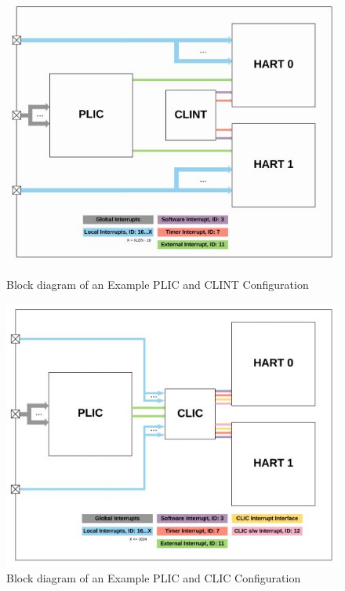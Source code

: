 \documentclass[12pt]{article}
\begin{document}
\begin{figure}
    \centering
    \includegraphics[scale=0.8]{PLIC and CLINT Block Diagram.JPG}
    \caption{Block diagram of an Example PLIC and CLINT Configuration}
    \vspace{20pt}
    \includegraphics[scale=0.8]{PLIC and CLIC Block Diagram.JPG}
    \caption{Block diagram of an Example PLIC and CLIC Configuration}
\end{figure}
\end{document}
